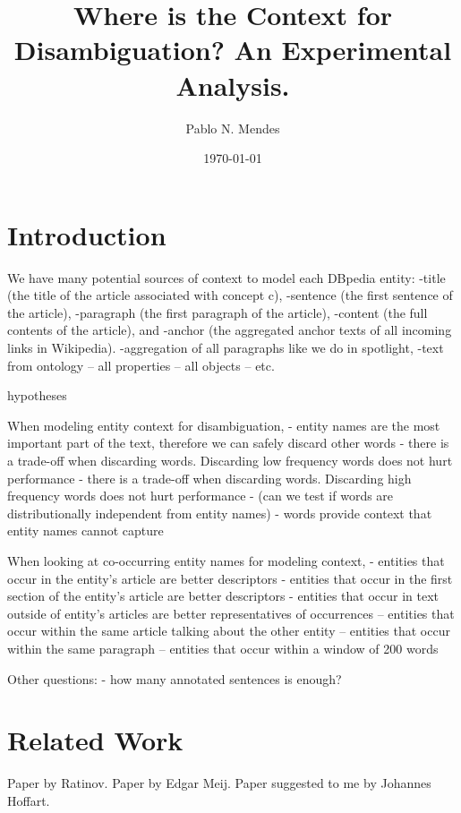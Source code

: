 \documentclass[10pt,a4paper]{article}
\title{Where is the Context for Disambiguation? An Experimental Analysis.}
\author{Pablo N. Mendes}
\date{\today}
\begin{document}
\maketitle

\begin{abstract}
\end{abstract}

\section{Introduction}

We have many potential sources of context to model each DBpedia entity:
-title (the title of the article associated with concept c), 
-sentence (the first sentence of the article),
-paragraph (the first paragraph of the article), 
-content (the full contents of the article), and 
-anchor (the aggregated anchor texts of all incoming links in Wikipedia).
-aggregation of all paragraphs like we do in spotlight,
-text from ontology
-- all properties
-- all objects
-- etc.

hypotheses

When modeling entity context for disambiguation,
- entity names are the most important part of the text, therefore we can safely discard other words 
- there is a trade-off when discarding words. Discarding low frequency words does not hurt performance
- there is a trade-off when discarding words. Discarding high frequency words does not hurt performance
- (can we test if words are distributionally independent from entity names)
- words provide context that entity names cannot capture

When looking at co-occurring entity names for modeling context,
- entities that occur in the entity's article are better descriptors
- entities that occur in the first section of the entity's article are better descriptors
- entities that occur in text outside of entity's articles are better representatives of occurrences
-- entities that occur within the same article talking about the other entity
-- entities that occur within the same paragraph
-- entities that occur within a window of 200 words

Other questions:
- how many annotated sentences is enough?

\section{Related Work}

Paper by Ratinov. \cite{acl11ratinov}
Paper by Edgar Meij. \cite{wsdm12meij.pdf}
Paper suggested to me by Johannes Hoffart.
\end{document}
